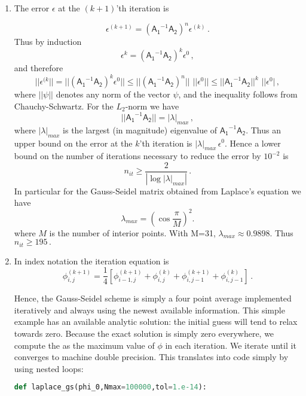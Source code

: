 \documentclass[11pt]{article}
\newcommand{\com}{\, ,}
\newcommand{\per}{\, .}
\def\beq{\begin{equation}}
\def\eeq{\end{equation}}
\newcommand{\ep}{\ensuremath {\epsilon}}
\begin{document}
\begin{enumerate}[label=(\alph*)]
    \item The error $\ep$ at the $(k+1)$'th iteration  is

        \beq
        \ep^{(k+1)} = \left(\mathsf{A_1}^{-1}\mathsf{A_2}\right)^n\ep^{(k)}\per
        \eeq
        Thus by induction 
        \beq
        \ep^{k} = \left(\mathsf{A_1}^{-1}\mathsf{A_2}\right)^k\ep^0\com
        \eeq
        and therefore
        \beq
        ||\ep^{(k}|| = ||\left(\mathsf{A_1}^{-1}\mathsf{A_2}\right)^k\ep^0|| \leq ||\left(\mathsf{A_1}^{-1}\mathsf{A_2}\right)^n||\,\, ||\ep^0||\leq||\mathsf{A_1}^{-1}\mathsf{A_2}||^k\,\, ||\ep^0| \com
        \eeq
        where $|| \mathsf{\psi} ||$ denotes any norm of the vector $\mathsf{\psi}$, and the inequality follows from Chauchy-Schwartz. For the $L_2$-norm we have
        \beq
        ||\mathsf{A_1}^{-1}\mathsf{A_2}|| = |\lambda|_{max}\com
        \eeq
        where $|\lambda|_{max}$ is the largest (in magnitude) eigenvalue of $\mathsf{A_1}^{-1}\mathsf{A_2}$. Thus an upper bound on the error at the $k$'th iteration is $|\lambda|_{max}\,\ep^0$. Hence a lower bound on the number of iterations necessary to reduce the error by $10^{-2}$ is
        \beq
        n_{it} \ge \frac{2}{|\log{|\lambda|_{max}}|}\per
        \eeq
        In particular for the Gauss-Seidel matrix obtained from Laplace's equation we have
        \beq
        \lambda_{max} = \left(\cos\frac{\pi}{M}\right)^2.
        \eeq
        where $M$ is the number of interior points. With M=31, $\lambda_{max} \approx 0.9898$. Thus $n_{it} \ge 195\per$

    \item In index notation the iteration equation is
        \beq
        \phi_{i,j}^{(k+1)} = \frac{1}{4}\left[\phi_{i-1,j}^{(k+1)}+\phi_{i,j}^{(k)}+\phi_{i,j-1}^{(k+1)}+\phi_{i,j-1}^{(k)}\right]\per
        \eeq

        Hence, the Gauss-Seidel scheme is simply a four point average implemented iteratively and always using the newest available information. This simple example has an available analytic solution: the initial guess will tend to relax towards zero. Because the exact solution is simply zero everywhere, we compute the as the maximum value of $\phi$ in each iteration. We iterate until it converges to machine double precision. This translates into code simply by using nested loops:

\begin{lstlisting}[language=python]
 def laplace_gs(phi_0,Nmax=100000,tol=1.e-14):
    

\end{lstlisting}
\end{enumerate}
\end{document}

